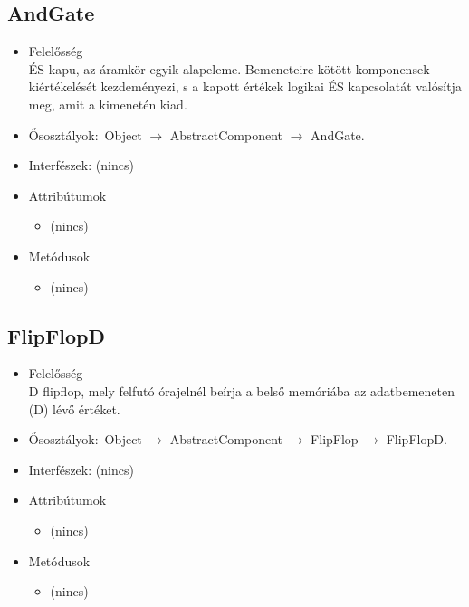\subsection{AndGate}
\begin{itemize}
\item Felelősség\\
ÉS kapu, az áramkör egyik alapeleme. Bemeneteire kötött komponensek  kiértékelését kezdeményezi, s a kapott értékek logikai ÉS kapcsolatát  valósítja meg, amit a kimenetén kiad.
\item Ősosztályok:\ Object $\rightarrow{}$ AbstractComponent $\rightarrow{}$ AndGate.
\item Interfészek: (nincs)
\item Attribútumok $\ $
\begin{itemize}
\item (nincs)
\end{itemize}
\item Metódusok$\ $
\begin{itemize}
\item (nincs)
\end{itemize}
\end{itemize}

\subsection{FlipFlopD}
\begin{itemize}
\item Felelősség\\
D flipflop, mely felfutó órajelnél beírja a belső memóriába az adatbemeneten (D)  lévő értéket.
\item Ősosztályok:\ Object $\rightarrow{}$ AbstractComponent $\rightarrow{}$ FlipFlop $\rightarrow{}$ FlipFlopD.
\item Interfészek: (nincs)
\item Attribútumok $\ $
\begin{itemize}
\item (nincs)
\end{itemize}
\item Metódusok$\ $
\begin{itemize}
\item (nincs)
\end{itemize}
\end{itemize}

